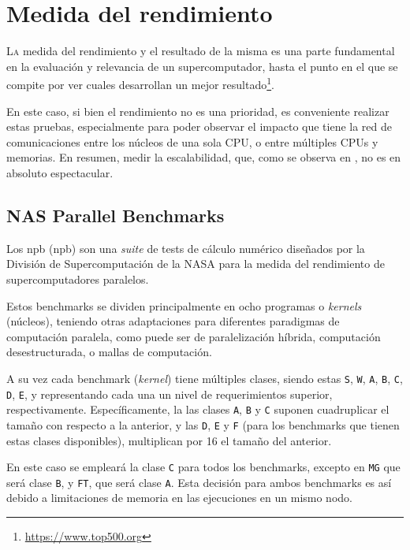 \chapter{Medida del rendimiento}
\label{chap:medida_rendimiento}

\lettrine{L}{a} medida del rendimiento y el resultado de la misma es una parte fundamental en la evaluación y relevancia de un supercomputador, hasta el punto en el que se compite por ver cuales desarrollan un mejor resultado\footnote{\url{https://www.top500.org}}.

En este caso, si bien el rendimiento no es una prioridad, es conveniente realizar estas pruebas, especialmente para poder observar el impacto que tiene la red de comunicaciones entre los núcleos de una sola CPU, o entre múltiples CPUs y memorias. En resumen, medir la escalabilidad, que, como se observa en , no es en absoluto espectacular.

\section{NAS Parallel Benchmarks}
Los \acrlong{npb} (\acrshort{npb}) \cite{npb_webpage} son una \textit{suite} de tests de cálculo numérico diseñados por la División de Supercomputación de la NASA para la medida del rendimiento de supercomputadores paralelos.

Estos benchmarks se dividen principalmente en ocho programas o \textit{kernels} (núcleos), teniendo otras adaptaciones para diferentes paradigmas de computación paralela, como puede ser de paralelización híbrida, computación desestructurada, o mallas de computación.

A su vez cada benchmark (\textit{kernel}) tiene múltiples clases, siendo estas \texttt{S}, \texttt{W}, \texttt{A}, \texttt{B}, \texttt{C}, \texttt{D}, \texttt{E}, y representando cada una un nivel de requerimientos superior, respectivamente. Específicamente, la las clases \texttt{A}, \texttt{B} y \texttt{C} suponen cuadruplicar el tamaño con respecto a la anterior, y las \texttt{D}, \texttt{E} y \texttt{F} (para los benchmarks que tienen estas clases disponibles), multiplican por 16 el tamaño del anterior.

En este caso se empleará la clase \texttt{C} para todos los benchmarks, excepto en \texttt{MG} que será clase \texttt{B}, y \texttt{FT}, que será clase \texttt{A}. Esta decisión para ambos benchmarks es así debido a limitaciones de memoria en las ejecuciones en un mismo nodo.

